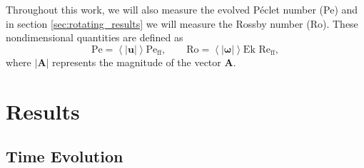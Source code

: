 \documentclass[aps, pre, onecolumn, nofootinbib, notitlepage, groupedaddress, amsfonts, amssymb, amsmath, longbibliography, superscriptaddress]{revtex4-1}
\newcommand{\angles}[1]{\ensuremath{\left\langle #1 \right\rangle}}
\newcommand{\Reff}{\ensuremath{\text{Re}_{\text{ff}}}}
\newcommand{\Peff}{\ensuremath{\text{Pe}_{\text{ff}}}}
\begin{document}
Throughout this work, we will also measure the evolved P\'{e}clet number (Pe) and in section \ref{sec:rotating_results} we will measure the Rossby number (Ro).
These nondimensional quantities are defined as
\begin{equation}
\text{Pe} = \angles{|\bm{u}|}\Peff,\qquad \text{Ro} = \angles{|\bm{\omega}|}\text{Ek }\Reff,
\end{equation}
where $|\bm{A}|$ represents the magnitude of the vector $\bm{A}$.


\section{Results}
\label{sec:2d_results}

\subsection{Time Evolution}
\label{sec:time_evolution}
\end{document}
